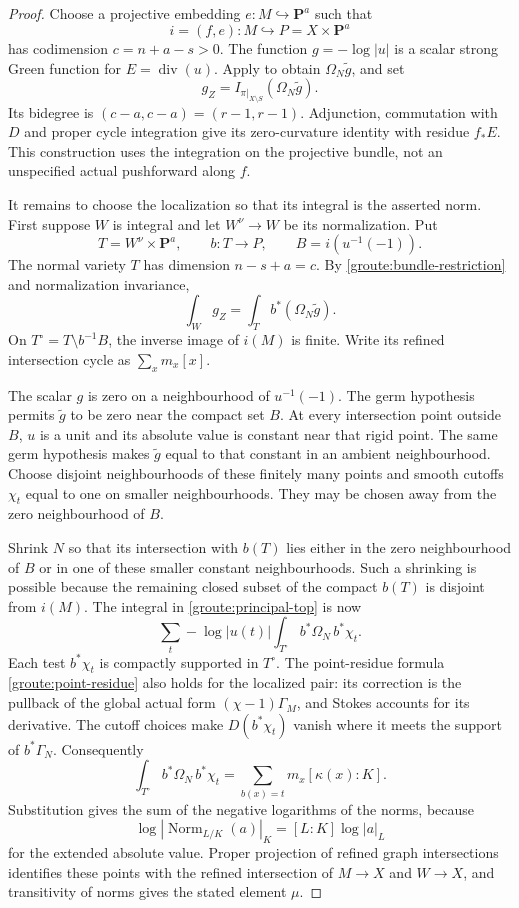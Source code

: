 \documentclass[11pt,a4paper]{article}
\theoremstyle{definition}
\numberwithin{equation}{section}
\newcommand{\Norm}{\operatorname{Norm}}
\newcommand{\Div}{\operatorname{div}}
\begin{document}
\begin{proof}
Choose a projective embedding $e:M\hookrightarrow\mathbf P^a$ such that
\[
 i=(f,e):M\hookrightarrow P=X\times\mathbf P^a
\]
has codimension $c=n+a-s>0$. The function $g=-\log|u|$ is a scalar strong Green function for $E=\Div(u)$. Apply  to obtain $\Omega_N\widetilde g$, and set
\begin{equation}\label{groute:principal-form}
 g_Z=I_{\pi|_{X\setminus S}}(\Omega_N\widetilde g).
\end{equation}
Its bidegree is $(c-a,c-a)=(r-1,r-1)$. Adjunction, commutation with $D$ and proper cycle integration give its zero-curvature identity with residue $f_*E$. This construction uses the integration on the projective bundle, not an unspecified actual pushforward along $f$.

It remains to choose the localization so that its integral is the asserted norm. First suppose $W$ is integral and let $W^\nu\to W$ be its normalization. Put
\[
 T=W^\nu\times\mathbf P^a,
 \qquad b:T\longrightarrow P,
 \qquad B=i(u^{-1}(-1)).
\]
The normal variety $T$ has dimension $n-s+a=c$. By \eqref{groute:bundle-restriction} and normalization invariance,
\begin{equation}\label{groute:principal-top}
 \int_Wg_Z=\int_T b^*(\Omega_N\widetilde g).
\end{equation}
On $T^\circ=T\setminus b^{-1}B$, the inverse image of $i(M)$ is finite. Write its refined intersection cycle as $\sum_xm_x[x]$.

The scalar $g$ is zero on a neighbourhood of $u^{-1}(-1)$. The germ hypothesis permits $\widetilde g$ to be zero near the compact set $B$. At every intersection point outside $B$, $u$ is a unit and its absolute value is constant near that rigid point. The same germ hypothesis makes $\widetilde g$ equal to that constant in an ambient neighbourhood. Choose disjoint neighbourhoods of these finitely many points and smooth cutoffs $\chi_t$ equal to one on smaller neighbourhoods. They may be chosen away from the zero neighbourhood of $B$.

Shrink $N$ so that its intersection with $b(T)$ lies either in the zero neighbourhood of $B$ or in one of these smaller constant neighbourhoods. Such a shrinking is possible because the remaining closed subset of the compact $b(T)$ is disjoint from $i(M)$. The integral in \eqref{groute:principal-top} is now
\[
 \sum_t -\log|u(t)|\int_{T^\circ}b^*\Omega_N\,b^*\chi_t.
\]
Each test $b^*\chi_t$ is compactly supported in $T^\circ$. The point-residue formula \eqref{groute:point-residue} also holds for the localized pair: its correction is the pullback of the global actual form $(\chi-1)\Gamma_M$, and Stokes accounts for its derivative. The cutoff choices make $D(b^*\chi_t)$ vanish where it meets the support of $b^*\Gamma_N$. Consequently
\[
 \int_{T^\circ}b^*\Omega_N\,b^*\chi_t
       =\sum_{b(x)=t}m_x[\kappa(x):K].
\]
Substitution gives the sum of the negative logarithms of the norms, because
\[
 \log|\Norm_{L/K}(a)|_K=[L:K]\log|a|_L
\]
for the extended absolute value. Proper projection of refined graph intersections identifies these points with the refined intersection of $M\to X$ and $W\to X$, and transitivity of norms gives the stated element $\mu$.


\end{proof}
\end{document}
